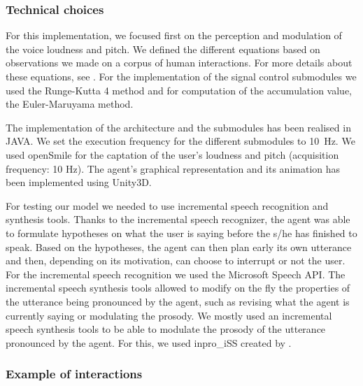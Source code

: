 \subsubsection{Technical choices}

For this implementation, we focused first on the perception and modulation of the voice loudness and pitch. We defined the different equations based on observations we made on a corpus of human interactions. For more details about these equations, see \cite{jegou_continuous_2015}. For the implementation of the signal control submodules we used the Runge-Kutta 4 method and for computation of the accumulation value, the Euler-Maruyama method. 

The implementation of the architecture and the submodules has been realised in JAVA. We set the execution frequency for the different submodules to 10~Hz. 
We used openSmile \citep{eyben_recent_2013} for the captation of the user's loudness and pitch (acquisition frequency: 10 Hz). %
The agent's graphical representation and its animation has been implemented using Unity3D. 

For testing our model we needed to use incremental speech recognition and synthesis tools. Thanks to the incremental speech recognizer, the agent was able to formulate hypotheses on what the user is saying before the s/he has finished to speak. Based on the hypotheses, the agent can then plan early its own utterance and then, depending on its motivation, can choose to interrupt or not the user. For the incremental speech recognition we used the Microsoft Speech API. 
The incremental speech synthesis tools allowed to modify on the fly the properties of the utterance being pronounced by the agent, such as revising what the agent  is currently saying or modulating the prosody. We mostly used an incremental speech synthesis tools to be able to modulate the prosody of the utterance pronounced by the agent. For this, we used inpro\_iSS created by \cite{baumann_inpro_2012}. 

\subsubsection{Example of interactions}


